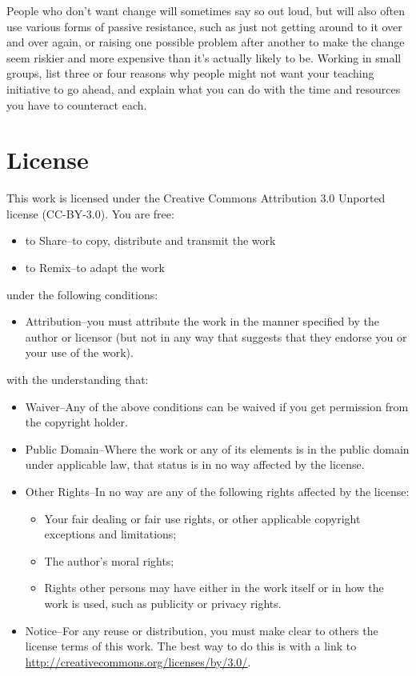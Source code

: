 \documentclass[10pt,statementpaper]{memoir}
\providecommand{\tightlist}{%
  \setlength{\itemsep}{0pt}\setlength{\parskip}{0pt}}
\begin{document}
People who don't want change will sometimes say so out loud, but will
also often use various forms of passive resistance, such as just not
getting around to it over and over again, or raising one possible
problem after another to make the change seem riskier and more expensive
than it's actually likely to be. Working in small groups, list three or
four reasons why people might not want your teaching initiative to go
ahead, and explain what you can do with the time and resources you have
to counteract each.

\chapter{License}\label{license}

This work is licensed under the Creative Commons Attribution 3.0
Unported license (CC-BY-3.0). You are free:

\begin{itemize}
\tightlist
\item
  to Share--to copy, distribute and transmit the work
\item
  to Remix--to adapt the work
\end{itemize}

\noindent
under the following conditions:

\begin{itemize}
\tightlist
\item
  Attribution--you must attribute the work in the manner specified by
  the author or licensor (but not in any way that suggests that they
  endorse you or your use of the work).
\end{itemize}

\noindent
with the understanding that:

\begin{itemize}
\item
  Waiver--Any of the above conditions can be waived if you get
  permission from the copyright holder.
\item
  Public Domain--Where the work or any of its elements is in the public
  domain under applicable law, that status is in no way affected by the
  license.
\item
  Other Rights--In no way are any of the following rights affected by
  the license:

  \begin{itemize}
  \tightlist
  \item
    Your fair dealing or fair use rights, or other applicable copyright
    exceptions and limitations;
  \item
    The author's moral rights;
  \item
    Rights other persons may have either in the work itself or in how
    the work is used, such as publicity or privacy rights.
  \end{itemize}
\item
  Notice--For any reuse or distribution, you must make clear to others
  the license terms of this work. The best way to do this is with a link
  to \url{http://creativecommons.org/licenses/by/3.0/}.
\end{itemize}
\end{document}
